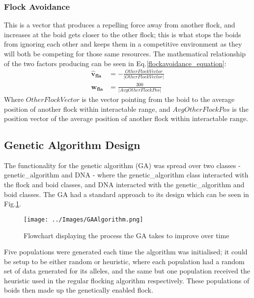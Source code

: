 \subsubsection{Flock Avoidance}
This is a vector that produces a repelling force away from another flock, and increases at the boid gets closer to the other flock; this is what stops the boids from ignoring each other and keeps them in a competitive environment as they will both be competing for those same resources. The mathematical relationship of the two factors producing  can be seen in Eq.\ref{flockavoidance_equation}:
\begin{equation}
\begin{split}
	\boldsymbol{\hat{v}_{fla}} &= -\frac{OtherFlockVector} {|OtherFlockVector|} \\
	\boldsymbol{w_{fla}} &= \frac{300} {|AvgOtherFlockPos|}
\end{split}
\label{flockavoidance_equation}
\end{equation}
Where $OtherFlockVector$ is the vector pointing from the boid to the average position of another flock within interactable range, and $AvgOtherFlockPos$ is the position vector of the average position of another flock within interactable range.



\subsection{Genetic Algorithm Design}
The functionality for the genetic algorithm (GA) was spread over two classes - genetic\_algorithm and DNA - where the genetic\_algorithm class interacted with the flock and boid classes, and DNA interacted with the genetic\_algorithm and boid classes. The GA had a standard approach to its design which can be seen in Fig.\ref{fig:geneticflow}.

\begin{figure}
	\texttt{[image: ../Images/GAAlgorithm.png]}
	\caption{Flowchart displaying the process the GA takes to improve over time}
	\label{fig:geneticflow}
\end{figure}

Five populations were generated each time the algorithm was initialised; it could be setup to be either random or heuristic, where each population had a random set of data generated for its alleles, and the same but one population received the heuristic used in the regular flocking algorithm respectively. These populations of boids then made up the genetically enabled flock. 


